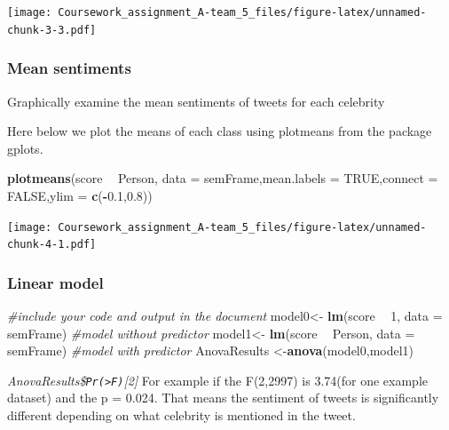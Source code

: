 \documentclass[]{article}
\newenvironment{Shaded}{\begin{snugshade}}{\end{snugshade}}
\newcommand{\KeywordTok}[1]{\textcolor[rgb]{0.13,0.29,0.53}{\textbf{#1}}}
\newcommand{\DataTypeTok}[1]{\textcolor[rgb]{0.13,0.29,0.53}{#1}}
\newcommand{\DecValTok}[1]{\textcolor[rgb]{0.00,0.00,0.81}{#1}}
\newcommand{\FloatTok}[1]{\textcolor[rgb]{0.00,0.00,0.81}{#1}}
\newcommand{\StringTok}[1]{\textcolor[rgb]{0.31,0.60,0.02}{#1}}
\newcommand{\CommentTok}[1]{\textcolor[rgb]{0.56,0.35,0.01}{\textit{#1}}}
\newcommand{\OtherTok}[1]{\textcolor[rgb]{0.56,0.35,0.01}{#1}}
\newcommand{\OperatorTok}[1]{\textcolor[rgb]{0.81,0.36,0.00}{\textbf{#1}}}
\newcommand{\NormalTok}[1]{#1}
\begin{document}
\texttt{[image: Coursework\_assignment\_A-team\_5\_files/figure-latex/unnamed-chunk-3-3.pdf]}

\subsubsection{Mean sentiments}\label{mean-sentiments}

Graphically examine the mean sentiments of tweets for each celebrity

Here below we plot the means of each class using plotmeans from the
package gplots.

\begin{Shaded}
\begin{Highlighting}[]
\KeywordTok{plotmeans}\NormalTok{(score }\OperatorTok{~}\StringTok{ }\NormalTok{Person, }\DataTypeTok{data =}\NormalTok{ semFrame,}\DataTypeTok{mean.labels =} \OtherTok{TRUE}\NormalTok{,}\DataTypeTok{connect =} \OtherTok{FALSE}\NormalTok{,}\DataTypeTok{ylim =} \KeywordTok{c}\NormalTok{(}\OperatorTok{-}\FloatTok{0.1}\NormalTok{,}\FloatTok{0.8}\NormalTok{))}
\end{Highlighting}
\end{Shaded}

\texttt{[image: Coursework\_assignment\_A-team\_5\_files/figure-latex/unnamed-chunk-4-1.pdf]}

\subsubsection{Linear model}\label{linear-model}

\begin{Shaded}
\begin{Highlighting}[]
\CommentTok{#include your code and output in the document}
\NormalTok{ model0<-}\StringTok{ }\KeywordTok{lm}\NormalTok{(score }\OperatorTok{~}\StringTok{ }\DecValTok{1}\NormalTok{, }\DataTypeTok{data =}\NormalTok{ semFrame) }\CommentTok{#model without predictor}
\NormalTok{ model1<-}\StringTok{ }\KeywordTok{lm}\NormalTok{(score }\OperatorTok{~}\StringTok{ }\NormalTok{Person, }\DataTypeTok{data =}\NormalTok{ semFrame) }\CommentTok{#model with predictor}
\NormalTok{ AnovaResults <-}\KeywordTok{anova}\NormalTok{(model0,model1)}
\end{Highlighting}
\end{Shaded}

\emph{AnovaResults\$\texttt{Pr(\textgreater{}F)}{[}2{]}} For example if
the F(2,2997) is 3.74(for one example dataset) and the p = 0.024. That
means the sentiment of tweets is significantly different depending on
what celebrity is mentioned in the tweet.
\end{document}
